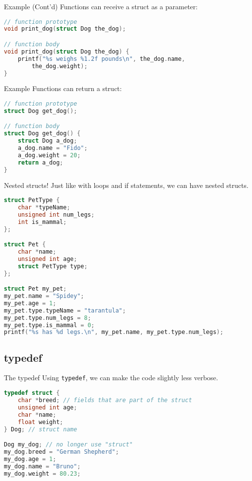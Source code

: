 \documentclass[graphics]{beamer}
\begin{document}
\begin{frame}[fragile]{Example (Cont'd)}
    Functions can receive a struct as a parameter:
    \begin{lstlisting}[language=C,basicstyle=\footnotesize,keywordstyle=\color{blue},commentstyle=\color{green},showstringspaces=false,stringstyle=\color{red}]
// function prototype
void print_dog(struct Dog the_dog);

// function body
void print_dog(struct Dog the_dog) {
    printf("%s weighs %1.2f pounds\n", the_dog.name,
        the_dog.weight);
}
    \end{lstlisting}
\end{frame}

\begin{frame}[fragile]{Example}
    Functions can return a struct:
    \begin{lstlisting}[language=C,basicstyle=\footnotesize,keywordstyle=\color{blue},commentstyle=\color{green},showstringspaces=false,stringstyle=\color{red}]
// function prototype
struct Dog get_dog();

// function body
struct Dog get_dog() {
    struct Dog a_dog;
    a_dog.name = "Fido";
    a_dog.weight = 20;
    return a_dog;
}
    \end{lstlisting}
\end{frame}

\begin{frame}[fragile]{Nested structs!}
    Just like with loops and if statements, we can have nested structs.
    \begin{lstlisting}[language=C,basicstyle=\footnotesize,keywordstyle=\color{blue},commentstyle=\color{green},showstringspaces=false,stringstyle=\color{red}]
struct PetType {
    char *typeName;
    unsigned int num_legs;
    int is_mammal;
};

struct Pet {
    char *name;
    unsigned int age;
    struct PetType type;
};

struct Pet my_pet;
my_pet.name = "Spidey";
my_pet.age = 1;
my_pet.type.typeName = "tarantula";
my_pet.type.num_legs = 8;
my_pet.type.is_mammal = 0;
printf("%s has %d legs.\n", my_pet.name, my_pet.type.num_legs);
    \end{lstlisting}
\end{frame}

\subsection{typedef}
\begin{frame}[fragile]{The typedef}
    Using \texttt{typedef}, we can make the code slightly less verbose.
    \begin{lstlisting}[language=C,basicstyle=\footnotesize,keywordstyle=\color{blue},commentstyle=\color{green},showstringspaces=false,stringstyle=\color{red}]
typedef struct {
    char *breed; // fields that are part of the struct
    unsigned int age;
    char *name;
    float weight;
} Dog; // struct name

Dog my_dog; // no longer use "struct"
my_dog.breed = "German Shepherd";
my_dog.age = 1;
my_dog.name = "Bruno";
my_dog.weight = 80.23;
    \end{lstlisting}
\end{frame}
\end{document}

